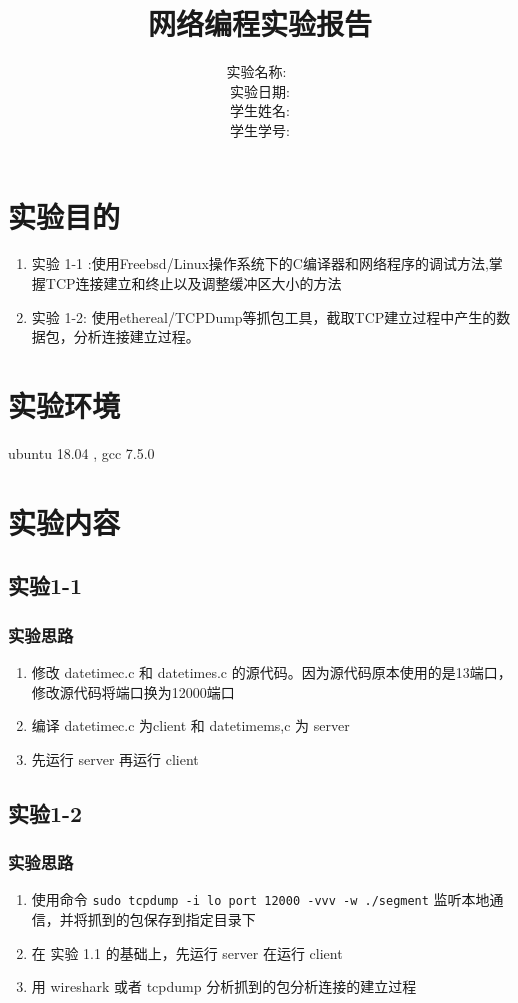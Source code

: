 \documentclass[a4paper,UTF8]{ctexart}
\title { \bfseries \huge 网络编程实验报告}
\author{
		 实验名称:~\makebox[10em][c]{网络编程第一次作业}\\
		 实验日期:\makebox[10em][c]{2020/5/1}\\
	 	 学生姓名:\makebox[10em][c]{杨彬}\\
	 	 学生学号:\makebox[10em][c]{09017423}\\
		}
\date{}
\begin{document}
\maketitle

	\section[aligh=left]{实验目的}
		\begin{enumerate}
			\item 实验 1-1 :使用Freebsd/Linux操作系统下的C编译器和网络程序的调试方法,掌握TCP连接建立和终止以及调整缓冲区大小的方法
			\item 实验 1-2: 使用ethereal/TCPDump等抓包工具，截取TCP建立过程中产生的数据包，分析连接建立过程。
		\end{enumerate}
	\section {实验环境}
		\par ubuntu 18.04 , gcc 7.5.0
	\section {实验内容}
		\subsection{实验1-1}
			\subsubsection{实验思路}
				\begin{enumerate}
					\item 修改 datetimec.c 和 datetimes.c 的源代码。因为源代码原本使用的是13端口，修改源代码将端口换为12000端口
					\item 编译 datetimec.c 为client 和 datetimems,c 为 server
					\item 先运行 server 再运行 client
				\end{enumerate}
		\subsection{实验1-2}
					\subsubsection{实验思路}
				\begin{enumerate}
					\item 使用命令 \verb|sudo tcpdump -i lo port 12000 -vvv -w ./segment| 监听本地通信，并将抓到的包保存到指定目录下
					\item 在 实验 1.1 的基础上，先运行 server 在运行 client
					\item 用 wireshark 或者 tcpdump 分析抓到的包分析连接的建立过程
				\end{enumerate}
\end{document}
